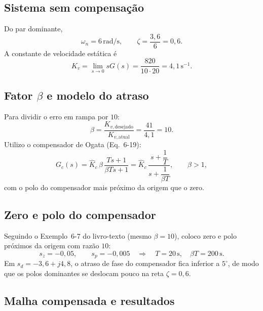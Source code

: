 \documentclass[11pt,a4paper]{article}
\begin{document}
\subsection*{Sistema sem compensação}

Do par dominante,
\begin{equation}
  \omega_n=6\,\mathrm{rad/s},\qquad \zeta=\frac{3{,}6}{6}=0{,}6.
\end{equation}
A constante de velocidade estática é
\begin{equation}
  K_v=\lim_{s\to 0}sG(s)=\frac{820}{10\cdot 20}=4{,}1\,\mathrm{s}^{-1}.
\end{equation}

\subsection*{Fator $\beta$ e modelo do atraso}

Para dividir o erro em rampa por $10$:
\begin{equation}
  \beta=\frac{K_{v,\mathrm{desejado}}}{K_{v,\mathrm{atual}}}=\frac{41}{4{,}1}=10.
\end{equation}
Utilizo o compensador de Ogata (Eq.~6-19):
\begin{equation}
  G_c(s)=\hat K_c\,\beta\,\frac{Ts+1}{\beta Ts+1}
  =\hat K_c\,\frac{s+\dfrac{1}{T}}{s+\dfrac{1}{\beta T}},\qquad \beta>1,
\end{equation}
com o polo do compensador mais próximo da origem que o zero.

\subsection*{Zero e polo do compensador}

Seguindo o Exemplo~6-7 do livro-texto (mesmo $\beta=10$), coloco zero e polo próximos da origem com razão $10$:
\begin{equation}
  s_z=-0{,}05,\qquad s_p=-0{,}005
  \quad\Longrightarrow\quad
  T=20\,\mathrm{s},\quad \beta T=200\,\mathrm{s}.
\end{equation}
Em $s_d=-3{,}6+j4{,}8$, o atraso de fase do compensador fica inferior a $5^\circ$, de modo que os polos dominantes se deslocam pouco na reta $\zeta=0{,}6$.

\subsection*{Malha compensada e resultados}
\end{document}
